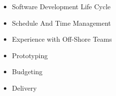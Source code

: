 
  \begin{itemize}
    \setlength\itemsep{-0.3em}
    \item Software Development Life Cycle %
    \item Schedule And Time Management
    \item Experience with Off-Shore Teams %
    \item Prototyping
    \item Budgeting
    \item Delivery
  \end{itemize}
